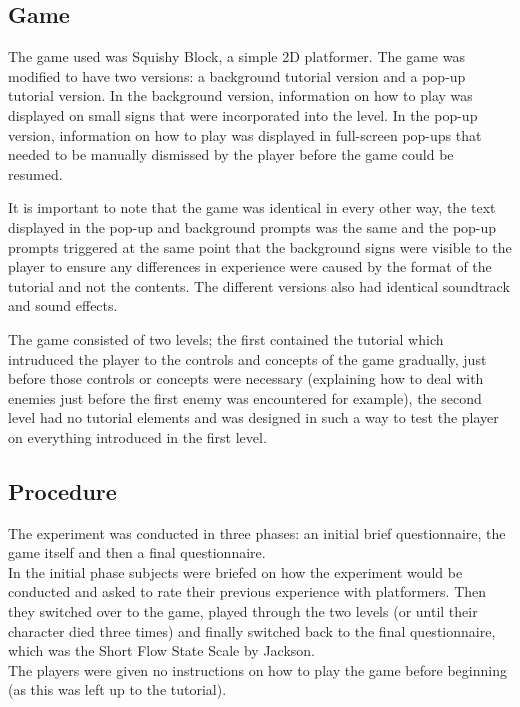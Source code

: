 \documentclass{acmsiggraph}
\begin{document}
\subsection{Game}

The game used was Squishy Block, a simple 2D platformer. The game was modified to have two versions: a background tutorial version and a pop-up tutorial version.
In the background version, information on how to play was displayed on small signs that were incorporated into the level. In the pop-up version, information on how to play was displayed in full-screen pop-ups that needed to be manually dismissed by the player before the game could be resumed.

It is important to note that the game was identical in every other way, the text displayed in the pop-up and background prompts was the same and the pop-up prompts triggered at the same point that the background signs were visible to the player to ensure any differences in experience were caused by the format of the tutorial and not the contents. The different versions also had identical soundtrack and sound effects.

The game consisted of two levels; the first contained the tutorial which intruduced the player to the controls and concepts of the game gradually, just before those controls or concepts were necessary (explaining how to deal with enemies just before the first enemy was encountered for example), the second level had no tutorial elements and was designed in such a way to test the player on everything introduced in the first level.

\subsection{Procedure}
The experiment was conducted in three phases: an initial brief questionnaire, the game itself and then a final questionnaire.\\
In the initial phase subjects were briefed on how the experiment would be conducted and asked to rate their previous experience with platformers. Then they switched over to the game, played through the two levels (or until their character died three times) and finally switched back to the final questionnaire, which was the Short Flow State Scale by Jackson.\\
The players were given no instructions on how to play the game before beginning (as this was left up to the tutorial).


\end{document}
